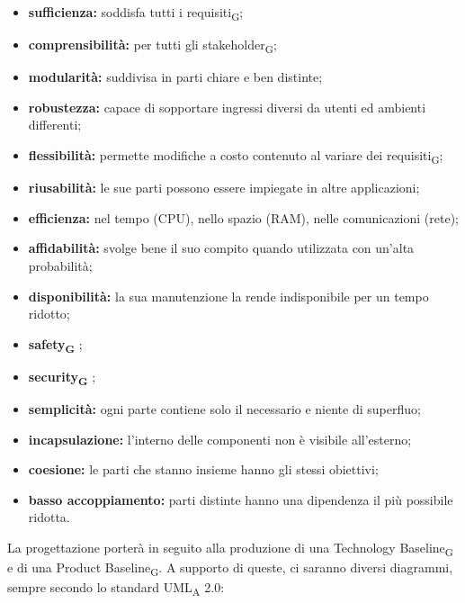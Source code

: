                 \begin{itemize}
                    \item \textbf{sufficienza: }soddisfa tutti i requisiti\textsubscript{G};
                    \item \textbf{comprensibilità: }per tutti gli stakeholder\textsubscript{G};
                    \item \textbf{modularità: }suddivisa in parti chiare e ben distinte;
                    \item \textbf{robustezza: }capace di sopportare ingressi diversi da utenti ed ambienti differenti;
                    \item \textbf{flessibilità: }permette modifiche a costo contenuto al variare dei requisiti\textsubscript{G};
                    \item \textbf{riusabilità: }le sue parti possono essere impiegate in altre applicazioni;
                    \item \textbf{efficienza: }nel tempo (CPU), nello spazio (RAM), nelle comunicazioni (rete);
                    \item \textbf{affidabilità: }svolge bene il suo compito quando utilizzata con un'alta probabilità;
                    \item \textbf{disponibilità: }la sua manutenzione la rende indisponibile per un tempo ridotto;
                    \item \textbf{safety\textsubscript{G} };
                    \item \textbf{security\textsubscript{G} };
                    \item \textbf{semplicità: }ogni parte contiene solo il necessario e niente di superfluo;
                    \item \textbf{incapsulazione: }l'interno delle componenti non è visibile all'esterno;
                    \item \textbf{coesione: }le parti che stanno insieme hanno gli stessi obiettivi;
                    \item \textbf{basso accoppiamento: }parti distinte hanno una dipendenza il più possibile ridotta.
                \end{itemize}
                La progettazione porterà in seguito alla produzione di una Technology Baseline\textsubscript{G} e di una Product Baseline\textsubscript{G}. A supporto di queste, ci saranno diversi diagrammi, sempre secondo lo standard UML\textsubscript{A} 2.0:
